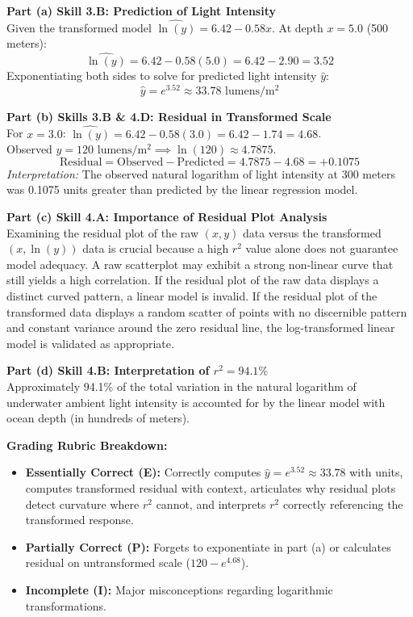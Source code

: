 \begin{frqrubricbox}
\textbf{Part (a) Skill 3.B: Prediction of Light Intensity}\\
Given the transformed model $\widehat{\ln(y)} = 6.42 - 0.58x$. At depth $x = 5.0$ (500 meters):
\[ \widehat{\ln(y)} = 6.42 - 0.58(5.0) = 6.42 - 2.90 = 3.52 \]
Exponentiating both sides to solve for predicted light intensity $\hat{y}$:
\[ \hat{y} = e^{3.52} \approx 33.78\text{ lumens/}\text{m}^2 \]

\textbf{Part (b) Skills 3.B \& 4.D: Residual in Transformed Scale}\\
For $x = 3.0$: $\widehat{\ln(y)} = 6.42 - 0.58(3.0) = 6.42 - 1.74 = 4.68$.\\
Observed $y = 120\text{ lumens/}\text{m}^2 \implies \ln(120) \approx 4.7875$.\\
\[ \text{Residual} = \text{Observed} - \text{Predicted} = 4.7875 - 4.68 = +0.1075 \]
\textit{Interpretation:} The observed natural logarithm of light intensity at 300 meters was 0.1075 units greater than predicted by the linear regression model.

\textbf{Part (c) Skill 4.A: Importance of Residual Plot Analysis}\\
Examining the residual plot of the raw $(x, y)$ data versus the transformed $(x, \ln(y))$ data is crucial because a high $r^2$ value alone does not guarantee model adequacy. A raw scatterplot may exhibit a strong non-linear curve that still yields a high correlation. If the residual plot of the raw data displays a distinct curved pattern, a linear model is invalid. If the residual plot of the transformed data displays a random scatter of points with no discernible pattern and constant variance around the zero residual line, the log-transformed linear model is validated as appropriate.

\textbf{Part (d) Skill 4.B: Interpretation of $r^2 = 94.1\%$}\\
Approximately 94.1\% of the total variation in the natural logarithm of underwater ambient light intensity is accounted for by the linear model with ocean depth (in hundreds of meters).

\textbf{Grading Rubric Breakdown:}\\
\begin{itemize}
  \item \textbf{Essentially Correct (E):} Correctly computes $\hat{y} = e^{3.52} \approx 33.78$ with units, computes transformed residual with context, articulates why residual plots detect curvature where $r^2$ cannot, and interprets $r^2$ correctly referencing the transformed response.
  \item \textbf{Partially Correct (P):} Forgets to exponentiate in part (a) or calculates residual on untransformed scale ($120 - e^{4.68}$).
  \item \textbf{Incomplete (I):} Major misconceptions regarding logarithmic transformations.
\end{itemize}
\end{frqrubricbox}

